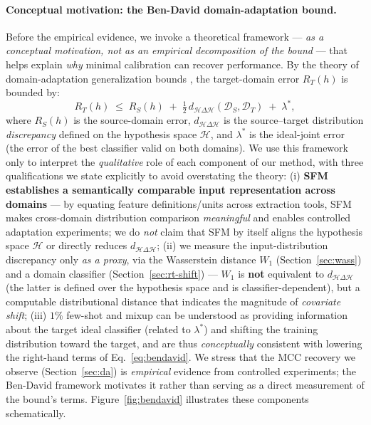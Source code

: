 \documentclass[preprint,12pt,authoryear]{elsarticle}
\begin{document}
\paragraph{Conceptual motivation: the Ben-David domain-adaptation bound.} Before
the empirical evidence, we invoke a theoretical framework --- \emph{as a conceptual
motivation, not as an empirical decomposition of the bound} --- that helps explain
\emph{why} minimal calibration can recover performance. By the theory of
domain-adaptation generalization bounds \citep{bendavid}, the target-domain error
$R_T(h)$ is bounded by:
\begin{equation}
\label{eq:bendavid}
R_T(h) \;\le\; R_S(h) \;+\; \tfrac{1}{2}\, d_{\mathcal{H}\Delta\mathcal{H}}(\mathcal{D}_S, \mathcal{D}_T) \;+\; \lambda^\ast,
\end{equation}
where $R_S(h)$ is the source-domain error, $d_{\mathcal{H}\Delta\mathcal{H}}$ is
the source--target distribution \emph{discrepancy} defined on the hypothesis
space $\mathcal{H}$, and $\lambda^\ast$ is the ideal-joint error (the error of the
best classifier valid on both domains). We use this framework only to interpret
the \emph{qualitative} role of each component of our method, with three
qualifications we state explicitly to avoid overstating the theory: (i)
\textbf{SFM establishes a semantically comparable input representation across
domains} --- by equating feature definitions/units across extraction tools, SFM
makes cross-domain distribution comparison \emph{meaningful} and enables controlled
adaptation experiments; we do \emph{not} claim that SFM by itself aligns the
hypothesis space $\mathcal{H}$ or directly reduces $d_{\mathcal{H}\Delta\mathcal{H}}$;
(ii) we measure the input-distribution discrepancy only \emph{as a proxy}, via the
Wasserstein distance $W_1$ (Section~\ref{sec:wass}) and a domain classifier
(Section~\ref{sec:rt-shift}) --- $W_1$ is \textbf{not} equivalent to
$d_{\mathcal{H}\Delta\mathcal{H}}$ (the latter is defined over the hypothesis space
and is classifier-dependent), but a computable distributional distance that
indicates the magnitude of \emph{covariate shift}; (iii) $1\%$ few-shot and mixup
can be understood as providing information about the target ideal classifier
(related to $\lambda^\ast$) and shifting the training distribution toward the
target, and are thus \emph{conceptually} consistent with lowering the
right-hand terms of Eq.~\eqref{eq:bendavid}. We stress that the MCC recovery we
observe (Section~\ref{sec:da}) is \emph{empirical} evidence from controlled
experiments; the Ben-David framework motivates it rather than serving as a direct
measurement of the bound's terms. Figure~\ref{fig:bendavid} illustrates these
components schematically.
\end{document}
